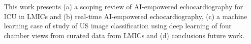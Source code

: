 \documentclass[mlabstract,twocolumn]{jmlr}
\begin{document}
This work presents (a) a scoping review of AI-empowered echocardiography for ICU in LMICs and (b) real-time AI-empowered echocardiography, (c) a machine learning case of study of US image classification using deep learning of four chamber views from curated data from LMICs and (d) conclusions future work.




\end{document}
